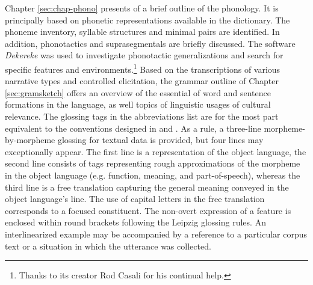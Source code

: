 Chapter  \ref{sec:chap-phono}   presents of a brief outline of the 
phonology. It is 
principally based on phonetic representations available in the dictionary.   
The 
phoneme inventory,  syllable structures and minimal pairs are identified. In 
addition, phonotactics and suprasegmentals are briefly discussed. The
software {\it Dekereke} was used to investigate phonotactic generalizations and 
search for specific features and environments.\footnote{Thanks to its creator 
Rod Casali 
for 
his continual help.}  Based on the 
transcriptions of various narrative types and controlled elicitation, the 
grammar outline of Chapter \ref{sec:gramsketch} offers an overview of  the 
essential of word and sentence formations in the language, as well topics of 
linguistic usages of cultural relevance. The glossing tags in the abbreviations 
list are for the most part equivalent to the conventions designed in  
\citet{Comr08b} and
\citet{hasp14}.  As a rule,   a three-line 
morpheme-by-morpheme  glossing for textual data is provided, but  four lines may 
exceptionally appear.  The first line is a representation of the object 
language, the second line consists of   tags representing  rough approximations  
 of the morpheme in the object   language (e.g. function, meaning,  and 
part-of-speech), whereas the third line is a free  translation capturing the 
general meaning  conveyed in the object language's line.  The use of capital 
letters in the  free translation corresponds to a focused constituent. The 
non-overt expression of a feature is enclosed within round brackets following 
the   Leipzig glossing 
rules. An interlinearized example  may  be 
accompanied by a reference  to a particular corpus text or  a situation in which 
 the utterance was collected.
 
 
 \newpage
 